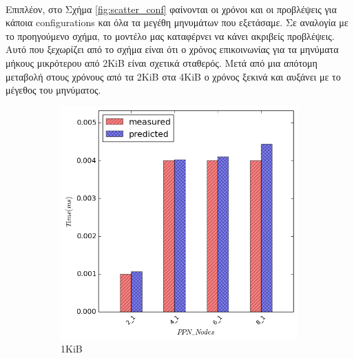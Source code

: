 \paragraph{}
Επιπλέον, στο Σχήμα \ref{fig:scatter_conf} φαίνονται οι χρόνοι και οι προβλέψεις για κάποια configu\-rations και όλα τα μεγέθη μηνυμάτων που εξετάσαμε. Σε αναλογία με το προηγούμενο σχήμα, το μοντέλο μας καταφέρνει να κάνει ακριβείς προβλέψεις. Αυτό που ξεχωρίζει από το σχήμα είναι ότι ο χρόνος επικοινωνίας για τα μηνύματα μήκους μικρότερου από 2KiB είναι σχετικά σταθερός. Μετά από μια απότομη μεταβολή στους χρόνους από τα 2KiB στα 4KiB ο χρόνος ξεκινά και αυξάνει με το μέγεθος του μηνύματος.
\begin{figure}[H]
    \centering
    \captionsetup{justification=centering,margin=0cm}
    \begin{subfigure}[b]{0.45\textwidth}
        \includegraphics[width=\textwidth]{./images/scatter/scatter_1024}
        \caption{1KiB}
    \end{subfigure}
    \quad 
        \begin{subfigure}[b]{0.45\textwidth}

\end{subfigure}
\end{figure}
